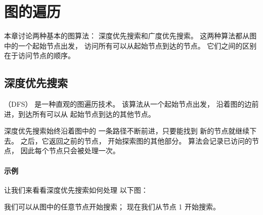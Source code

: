 \chapter{图的遍历}

本章讨论两种基本的图算法：
深度优先搜索和广度优先搜索。
这两种算法都从图中的一个起始节点出发，
访问所有可以从起始节点到达的节点。
它们之间的区别在于访问节点的顺序。

\section{深度优先搜索}


（DFS）
是一种直观的图遍历技术。
该算法从一个起始节点出发，
沿着图的边前进，到达所有可以从
起始节点到达的其他节点。

深度优先搜索始终沿着图中的
一条路径不断前进，只要能找到
新的节点就继续下去。
之后，它返回之前的节点，
开始探索图的其他部分。
算法会记录已访问的节点，
因此每个节点只会被处理一次。

\subsubsection*{示例}

让我们来看看深度优先搜索如何处理
以下图：
\begin{center}
\end{center}
我们可以从图中的任意节点开始搜索；
现在我们从节点 1 开始搜索。

